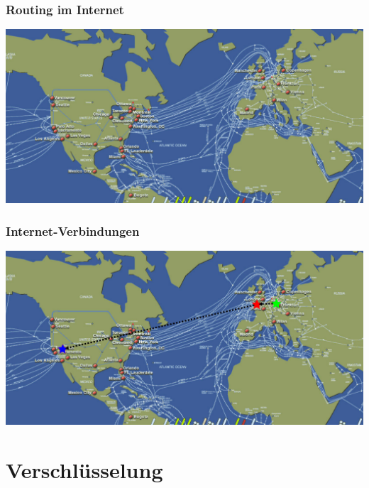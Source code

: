 \documentclass[12pt]{beamer}
\begin{document}
\begin{frame}
    \frametitle{Routing im Internet}
    \begin{center}
      \includegraphics[height=0.7\textheight]{img/internet_cable_map.png}
    \end{center}
\end{frame}

\begin{frame}
    \frametitle{Internet-Verbindungen}
    \begin{center}
      \includegraphics[height=0.7\textheight]{img/internetmap-abhoeren}
    \end{center}
\end{frame}

\section{Verschlüsselung}
\subsection{}
\end{document}
